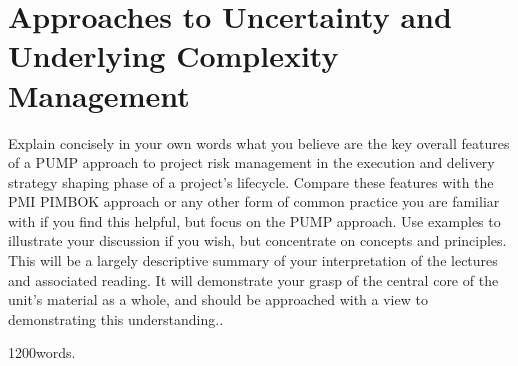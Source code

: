 \section{Approaches to Uncertainty and Underlying Complexity Management}

Explain concisely in your own words what you believe are the key overall features of a PUMP approach to project risk management in the execution and delivery strategy shaping phase of a project’s lifecycle. Compare these features with the PMI PIMBOK approach or any other form of common practice you are familiar with if you find this helpful, but focus on the PUMP approach. Use examples to illustrate your discussion if you wish, but concentrate on concepts and principles. This will be a largely descriptive summary of your interpretation of the lectures and associated reading. It will demonstrate your grasp of the central core of the unit’s material as a whole, and should be approached with a view to demonstrating this understanding..

1200words.